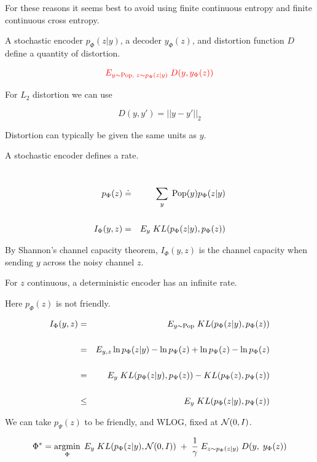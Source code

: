 {\vfill
For these reasons it seems best to avoid using finite continuous entropy and finite continuous cross entropy.


A stochastic encoder $p_\Phi(z|y)$, a decoder $y_\Phi(z)$, and distortion function $D$ define a quantity of distortion.

$${\color{red} E_{y \sim \mathrm{Pop},\;z \sim p_\Phi(z|y)}\;D(y,y_\Phi(z))}$$

\vfill
For $L_2$ distortion we can use

$$D(y,y') = ||y - y'||_2$$

\vfill
Distortion can typically be given the same units as $y$.


A stochastic encoder defines a rate.

\vfill
{\
\begin{eqnarray*}
p_\Phi(z) & \doteq & \sum_y\; \mathrm{Pop}(y)p_\Phi(z|y) \\
\\
I_\Phi(y,z) & = &  E_y \;KL(p_\Phi(z|y),p_\Phi(z))
\end{eqnarray*}


\vfill
By Shannon's channel capacity theorem, $I_\Phi(y,z)$ is the channel capacity when sending $y$ across the noisy channel $z$.

\vfill
For $z$ continuous, a deterministic encoder has an infinite rate.

\vfill
{\color{red}  Here $p_\Phi(z)$ is not friendly.}


\begin{eqnarray*}
I_\Phi(y,z) & = & E_{y \sim \mathrm{Pop}}\; KL(p_\Phi(z|y),p_\Phi(z)) \\
\\
& = & E_{y,z} \ln p_\Phi(z|y) - \ln p_\Psi(z) + \ln p_\Psi(z) - \ln p_\Phi(z) \\
\\
& = & E_y\;KL(p_\Phi(z|y),p_\Psi(z)) - KL(p_\Phi(z),p_\Psi(z)) \\
\\
& \leq & E_y\;KL(p_\Phi(z|y),p_\Psi(z))
\end{eqnarray*}

\vfill
{\color{red} We can take $p_\Psi(z)$ to be friendly, and WLOG, fixed at ${\cal N}(0,I)$.}


{\color{red} {\Huge $$\Phi^* = \operatorname*{argmin}_{\Phi}\;E_y \;KL(p_\Phi(z|y),{\cal N}(0,I)) \;+\; \frac{1}{\gamma} \; E_{z\sim p_\Phi(z|y)}\;D(y,\;y_\Phi(z))$$}}

}}
